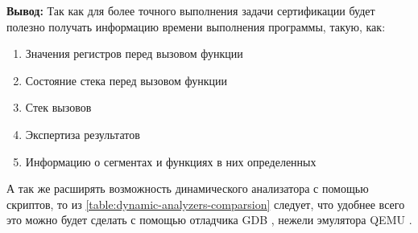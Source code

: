 \textbf{Вывод:} Так как для более точного выполнения задачи сертификации будет полезно получать
информацию времени выполнения программы, такую, как:
\begin{enumerate}
    \item Значения регистров перед вызовом функции
    \item Состояние стека перед вызовом функции
    \item Стек вызовов
    \item Экспертиза результатов
    \item Информацию о сегментах и функциях в них определенных
\end{enumerate}
А так же расширять возможность динамического анализатора с помощью скриптов,
то из \autoref{table:dynamic-analyzers-comparsion} следует, что
удобнее всего это можно будет сделать с помощью отладчика GDB \autocite{gdb},
нежели эмулятора QEMU \autocite{qemu}.

